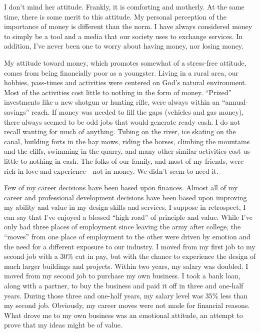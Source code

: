 \documentclass[12pt]{memoir}
\begin{document}
I don't mind her attitude. Frankly, it is comforting and motherly.
At the same time, there is some merit to this attitude. My personal
perception of the importance of money is different than the norm.
I have always considered money to simply be a tool and a media that
our society uses to exchange services. In addition, I've never been
one to worry about having money, nor losing money. 

My attitude toward money, which promotes somewhat of a stress-free
attitude, comes from being financially poor as a youngster. Living
in a rural area, our hobbies, pass-times and activities were centered
on God's natural environment. Most of the activities cost little to
nothing in the form of money. ``Prized'' investments like a new
shotgun or hunting rifle, were always within an ``annual-savings''
reach. If money was needed to fill the gaps (vehicles and gas money),
there always seemed to be odd jobs that would generate ready cash.
I do not recall wanting for much of anything. Tubing on the river,
ice skating on the canal, building forts in the hay mows, riding the
horses, climbing the mountains and the cliffs, swimming in the quarry,
and many other similar activities cost us little to nothing in cash.
The folks of our family, and most of my friends, were rich in love
and experience---not in money. We didn't seem to need it. 

Few of my career decisions have been based upon finances. Almost all
of my career and professional development decisions have been based
upon improving my ability and value in my design skills and services.
I suppose in retrospect, I can say that I've enjoyed a blessed ``high
road'' of principle and value. While I've only had three places of
employment since leaving the army after college, the ``moves'' from
one place of employment to the other were driven by emotion and the
need for a different exposure to our industry. I moved from my first
job to my second job with a 30\% cut in pay, but with the chance to
experience the design of much larger buildings and projects. Within
two years, my salary was doubled. I moved from my second job to purchase
my own business. I took a bank loan, along with a partner, to buy
the business and paid it off in three and one-half years. During those
three and one-half years, my salary level was 35\% less than my second
job. Obviously, my career moves were not made for financial reasons.
What drove me to my own business was an emotional attitude, an attempt
to prove that my ideas might be of value. 
\end{document}
